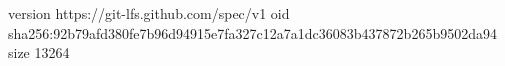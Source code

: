 version https://git-lfs.github.com/spec/v1
oid sha256:92b79afd380fe7b96d94915e7fa327c12a7a1dc36083b437872b265b9502da94
size 13264
